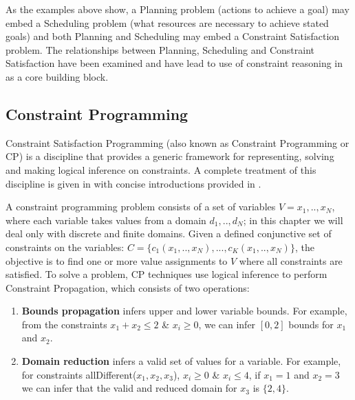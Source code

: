 {As the examples above show, a Planning problem (actions to achieve a
goal) may embed a Scheduling problem (what resources are necessary to
achieve stated goals) and both Planning and Scheduling may embed a
Constraint Satisfaction problem.  The relationships between Planning,
Scheduling and Constraint Satisfaction have been examined
\cite{smith00} and have lead to use of constraint reasoning in \eu as
a core building block.

\subsection{Constraint Programming}
\label{sec:europa:cp}

Constraint Satisfaction Programming (also known as Constraint
Programming or \textsf{CP}) is a discipline that provides a generic
framework for representing, solving and making logical inference on
constraints. A complete treatment of this discipline is given in
\cite{marriott98,apt03} with concise introductions provided in
\cite{bartak99,lustig01}.

A constraint programming problem consists of a set of variables $V=
{x_1,..,x_N}$, where each variable takes values from a domain
$d_1,..,d_N$; in this chapter we will deal only with discrete and
finite domains. Given a defined conjunctive set of constraints on the
variables: $C=\{c_1(x_1,..,x_N), ..., c_K(x_1,..,x_N)\}$, the
objective is to find one or more value assignments to $V$ where all
constraints are satisfied. To solve a problem, \textsf{CP} techniques
use logical inference to perform Constraint Propagation, which
consists of two operations:

\begin{enumerate}

\item \textbf{Bounds propagation} infers upper and lower variable
  bounds. For example, from the constraints $x_1 + x_2 \leq 2$ \& $x_i
  \geq 0$, we can infer $[0,2]$ bounds for $x_1$ and $x_2$.

\item \textbf{Domain reduction} infers a valid set of values for a
  variable.  For example, for constraints allDifferent($x_1,x_2,x_3$),
  $x_i \geq 0$ \& $x_i \leq 4$, if $x_1 = 1$ and $x_2 = 3$ we can
  infer that the valid and reduced domain for $x_3$ is $\{2,4\}$.

\end{enumerate}

}
